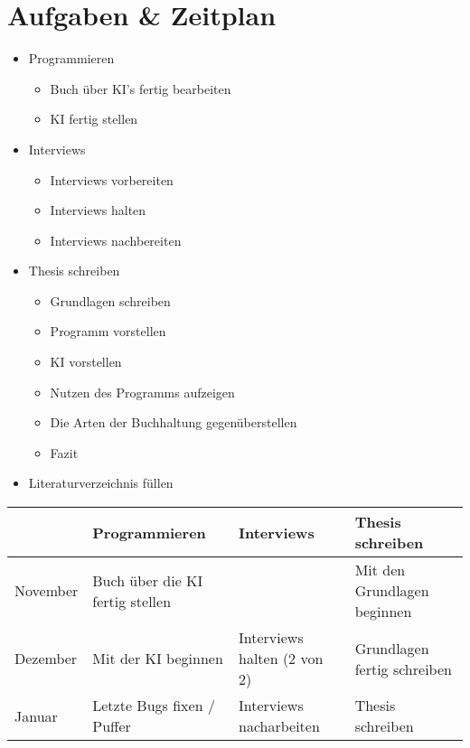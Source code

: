 \documentclass[hidelinks,12pt,a4paper]{article}
\begin{document}
\newpage
\section{Aufgaben \& Zeitplan}
\begin{itemize}
	\item Programmieren
	\begin{itemize}
		\item Buch über KI's fertig bearbeiten 
		\item KI fertig stellen 
	\end{itemize}

	\item Interviews
	\begin{itemize}
		\item Interviews vorbereiten 
		\item Interviews halten 
		\item Interviews nachbereiten 
	\end{itemize}

	\item Thesis schreiben 
	\begin{itemize}
		\item Grundlagen schreiben 
		\item Programm vorstellen 
		\item KI vorstellen 
		\item Nutzen des Programms aufzeigen 
		\item Die Arten der Buchhaltung gegenüberstellen 
		\item Fazit 
	\end{itemize}

	\item Literaturverzeichnis füllen
\end{itemize}


  \begin{tabularx}{\textwidth}{|l*{3}{|>{\raggedright\arraybackslash}X}|}\hline
	& Programmieren & Interviews & Thesis schreiben \\\hline
	November & Buch über die KI fertig stellen & & Mit den Grundlagen beginnen \\\hline
	Dezember & Mit der KI beginnen & Interviews halten (2 von 2) & Grundlagen fertig schreiben \\\hline
	Januar & Letzte Bugs fixen / Puffer & Interviews nacharbeiten & Thesis schreiben  \\\hline
\end{tabularx}
  

%
\end{document}
